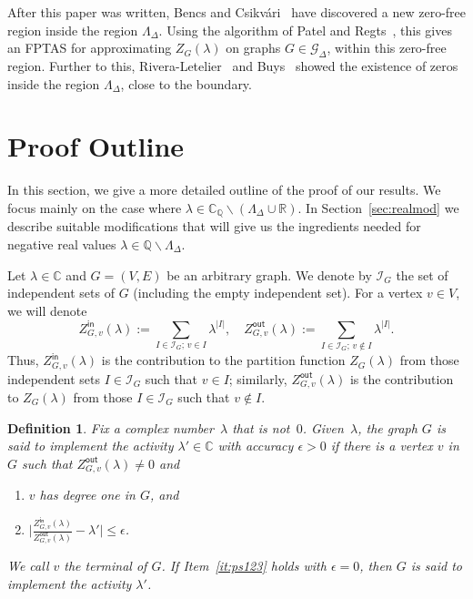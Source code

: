 \documentclass[11pt]{article}
\newtheorem{definition}[theorem]{Definition}
\def\Zin{Z^{\mathsf{in}}}
\def\Zout{Z^{\mathsf{out}}}
\def\Reals{\mathbb{R}}
\def\QQ{\mathbb{Q}}
\def\Complex{\mathbb{C}}
\def\CQ{\mathbb{C}_{\mathbb{Q}}}
\def\LambdaD{\Lambda_\Delta}
\begin{document}
After this paper was written, Bencs and Csikv\'ari~\cite{BC} have discovered a new zero-free region
inside the region $\LambdaD$. Using the algorithm of Patel and Regts~\cite{PR},
this gives  
an FPTAS for
approximating $Z_G(\lambda)$  on graphs $G\in \mathcal{G}_\Delta$, within this zero-free region. Further to this, Rivera-Letelier~\cite{JRL} and Buys~\cite{Buys} showed the existence of zeros inside the region $\LambdaD$, close to the boundary.
 



\section{Proof Outline}\label{sec:outline}
In this section, we give a more detailed outline of the proof of our results. We focus mainly on the case where $\lambda\in \CQ\backslash(\LambdaD\cup \Reals)$.
In Section~\ref{sec:realmod} we describe suitable modifications 
that will give us the ingredients needed for negative real values $\lambda\in \QQ\backslash\LambdaD$.

 
Let $\lambda\in \Complex$ and $G=(V,E)$ be an arbitrary graph. We denote by $\mathcal{I}_G$ the set of independent sets of $G$
(including the empty independent set). 
For a vertex $v\in V$, we will denote
\[\Zin_{G,v}(\lambda):=\sum_{I\in \mathcal{I}_G;\, v\in I}\lambda^{|I|},\quad \Zout_{G,v}(\lambda):=\sum_{I\in \mathcal{I}_G;\, v\notin I}\lambda^{|I|}.\]
Thus, $\Zin_{G,v}(\lambda)$ is the contribution to the partition function $Z_G(\lambda)$ from those independent sets $I\in \mathcal{I}_G$ such that $v\in I$; similarly, $\Zout_{G,v}(\lambda)$ is the contribution to $Z_G(\lambda)$ from those $I\in \mathcal{I}_G$ such that $v\notin I$. 
\begin{definition}\label{def:Gimplement}
Fix a complex number~$\lambda$ that is not~$0$. Given~$\lambda$,
the graph $G$  is said to \emph{implement} the activity $\lambda'\in \Complex$ with \emph{accuracy} $\epsilon>0$ if there is a vertex $v$ in $G$ such that $\Zout_{G,v}(\lambda)\neq 0$  and
\begin{enumerate}
\item \label{it:voneGde} $v$ has degree one in $G$, and
\item  \label{it:ps123}   $\displaystyle \Big|\frac{\Zin_{G,v}(\lambda)}{\Zout_{G,v}(\lambda)}-\lambda'|\leq \epsilon $.
\end{enumerate}
We call $v$ the terminal of $G$. If Item~\ref{it:ps123} holds with $\epsilon=0$, then $G$ is said to \emph{implement} the activity $\lambda'$.
\end{definition}
\end{document}
